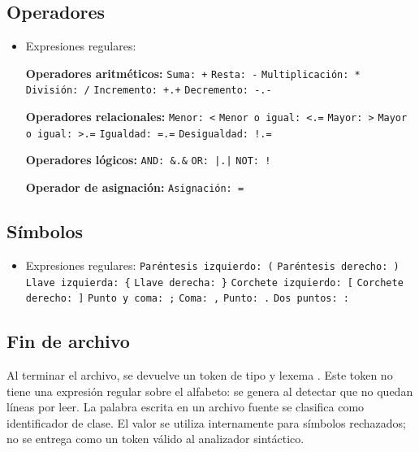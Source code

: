 
\subsection{Operadores}
\begin{itemize}[leftmargin=*]
  \item Expresiones regulares:

  \subitem \textbf{Operadores aritméticos:}
  \subitem \verb~Suma: +~
  \subitem \verb~Resta: -~
  \subitem \verb~Multiplicación: *~
  \subitem \verb~División: /~
  \subitem \verb~Incremento: +.+~
  \subitem \verb~Decremento: -.-~

  \subitem \textbf{Operadores relacionales:}
  \subitem \verb~Menor: <~
  \subitem \verb~Menor o igual: <.=~
  \subitem \verb~Mayor: >~
  \subitem \verb~Mayor o igual: >.=~
  \subitem \verb~Igualdad: =.=~
  \subitem \verb~Desigualdad: !.=~

  \subitem \textbf{Operadores lógicos:}
  \subitem \verb~AND: &.&~
  \subitem \verb~OR: |.|~
  \subitem \verb~NOT: !~

  \subitem \textbf{Operador de asignación:}
  \subitem \verb~Asignación: =~
\end{itemize}


\subsection{Símbolos}
\begin{itemize}[leftmargin=*]
  \item Expresiones regulares:
  \subitem \verb~Paréntesis izquierdo: (~
  \subitem \verb~Paréntesis derecho: )~
  \subitem \verb~Llave izquierda: {~
  \subitem \verb~Llave derecha: }~
  \subitem \verb~Corchete izquierdo: [~
  \subitem \verb~Corchete derecho: ]~
  \subitem \verb~Punto y coma: ;~
  \subitem \verb~Coma: ,~
  \subitem \verb~Punto: .~
  \subitem \verb~Dos puntos: :~
\end{itemize}

\subsection{Fin de archivo}
Al terminar el archivo, se devuelve un token de tipo  y lexema
. Este token no tiene una expresión regular sobre el alfabeto:
se genera al detectar que no quedan líneas por leer. La palabra escrita
 en un archivo fuente se clasifica como identificador de clase.
El valor  se utiliza internamente para símbolos rechazados;
no se entrega como un token válido al analizador sintáctico.

